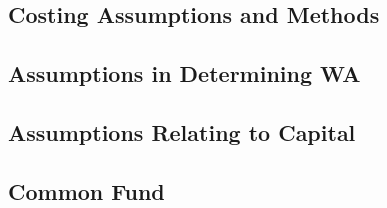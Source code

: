 \subsection{Costing Assumptions and Methods}

\subsection{Assumptions in Determining WA}

\subsection{Assumptions Relating to Capital}

\subsection{Common Fund}


